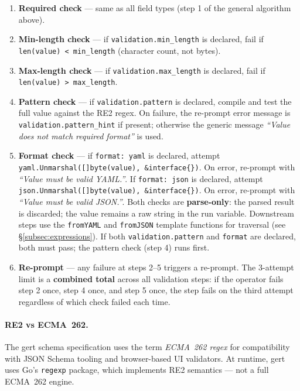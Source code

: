 \begin{enumerate}
  \item \textbf{Required check} — same as all field types (step 1 of the general
        algorithm above).
  \item \textbf{Min-length check} — if \texttt{validation.min\_length} is declared,
        fail if \texttt{len(value) < min\_length} (character count, not bytes).
  \item \textbf{Max-length check} — if \texttt{validation.max\_length} is declared,
        fail if \texttt{len(value) > max\_length}.
  \item \textbf{Pattern check} — if \texttt{validation.pattern} is declared, compile
        and test the full value against the RE2 regex.  On failure, the re-prompt
        error message is \texttt{validation.pattern\_hint} if present; otherwise the
        generic message \emph{``Value does not match required format''} is used.
  \item \textbf{Format check} — if \texttt{format: yaml} is declared, attempt
        \texttt{yaml.Unmarshal([]byte(value), \&interface\{\})}.  On error, re-prompt
        with \emph{``Value must be valid YAML.''}.  If \texttt{format: json} is
        declared, attempt \texttt{json.Unmarshal([]byte(value), \&interface\{\})}.
        On error, re-prompt with \emph{``Value must be valid JSON.''}.  Both checks
        are \textbf{parse-only}: the parsed result is discarded; the value remains a
        raw string in the run variable.  Downstream steps use the \texttt{fromYAML}
        and \texttt{fromJSON} template functions for traversal
        (see §\ref{subsec:expressions}).  If both \texttt{validation.pattern}
        and \texttt{format} are declared, both must pass; the pattern check (step 4)
        runs first.
  \item \textbf{Re-prompt} — any failure at steps 2--5 triggers a re-prompt.  The
        3-attempt limit is a \textbf{combined total} across all validation steps: if
        the operator fails step 2 once, step 4 once, and step 5 once, the step fails
        on the third attempt regardless of which check failed each time.
\end{enumerate}

\paragraph{RE2 vs ECMA~262.}
The gert schema specification uses the term \emph{ECMA~262 regex} for compatibility
with JSON Schema tooling and browser-based UI validators.  At runtime, gert uses Go's
\texttt{regexp} package, which implements RE2 semantics — not a full ECMA~262 engine.

